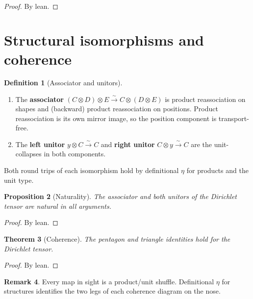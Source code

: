 \documentclass[11pt,a4paper]{article}
\theoremstyle{plain}
\newtheorem{theorem}{Theorem}[section]
\newtheorem{proposition}[theorem]{Proposition}
\theoremstyle{definition}
\newtheorem{definition}[theorem]{Definition}
\newtheorem{remark}[theorem]{Remark}
\newcommand{\Dir}{\mathbin{\otimes}}
\begin{document}
\begin{proof}
By lean.
\end{proof}

\section{Structural isomorphisms and coherence}

\begin{definition}[Associator and unitors]\label{def:dir-struct}
\begin{enumerate}
  \item The \textbf{associator}
        $(C \Dir D) \Dir E \xrightarrow{\sim} C \Dir (D \Dir E)$ is
        product reassociation on shapes and (backward) product
        reassociation on positions. Product reassociation is its own
        mirror image, so the position component is transport-free.
  \item The \textbf{left unitor} $y \Dir C \xrightarrow{\sim} C$ and
        \textbf{right unitor} $C \Dir y \xrightarrow{\sim} C$ are the
        unit-collapses in both components.
\end{enumerate}
Both round trips of each isomorphism hold by definitional $\eta$ for
products and the unit type.
\end{definition}

\begin{proposition}[Naturality]\label{prop:dir-nat}
The associator and both unitors of the Dirichlet tensor are natural in
all arguments.
\end{proposition}

\begin{proof}
By lean.
\end{proof}

\begin{theorem}[Coherence]\label{thm:dir-coherence}
The pentagon and triangle identities hold for the Dirichlet tensor.
\end{theorem}

\begin{proof}
By lean.
\end{proof}

\begin{remark}
Every map in sight is a product/unit shuffle. Definitional $\eta$ for
structures identifies the two legs of each coherence diagram on the nose.
\end{remark}
\end{document}
